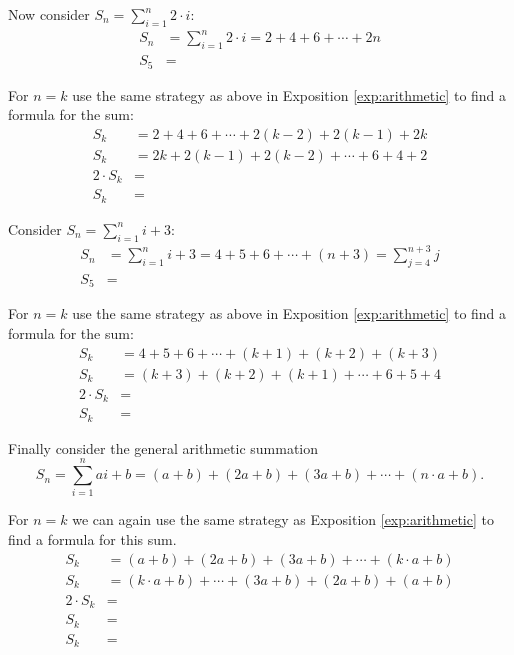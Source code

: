 \begin{practiceprob} Now consider \(S_n=\sum_{i=1}^n 2\cdot i\):
    \begin{align*}
        S_n&=\sum_{i=1}^n 2\cdot i=2+4+6+\cdots+2n\\[20pt]
        S_5&=
    \end{align*}
    
    For \(n=k\) use the same strategy as above in Exposition \ref{exp:arithmetic} to find a formula for the sum:
    \begin{align*}
        S_{k}&=2+4+6+\cdots+2(k-2)+2(k-1)+2k\\
        S_{k}&=2k+2(k-1)+2(k-2)+\cdots+6+4+2\\[20pt]
        2\cdot S_{k}&=\\[20pt]
        S_{k}&=
    \end{align*}
\end{practiceprob}

\begin{practiceprob} Consider \(S_n=\sum_{i=1}^n i+3\):
    \begin{align*}
        S_n&=\sum_{i=1}^n i+3 = 4+5+6+\cdots+(n+3)=\sum_{j=4}^{n+3} j\\[20pt]
        S_5&=
    \end{align*}

For \(n=k\) use the same strategy as above in Exposition \ref{exp:arithmetic} to find a formula for the sum:
    \begin{align*}
        S_{k}&=4+5+6+\cdots+(k+1)+(k+2)+(k+3)\\
        S_{k}&=(k+3)+(k+2)+(k+1)+\cdots+6+5+4\\[20pt]
        2\cdot S_{k}&=\\[20pt]
        S_{k}&=
    \end{align*}
\end{practiceprob}

\clearpage

\begin{exposition}\label{exp:gen_arith} Finally consider the general arithmetic summation \[S_n=\sum_{i=1}^n ai+b=(a+b)+(2a+b)+(3a+b)+\cdots+(n\cdot a+b).\]

For \(n=k\) we can again use the same strategy as Exposition \ref{exp:arithmetic} to find a formula for this sum.
    \begin{align*}
        S_{k}&=(a+b)+(2a+b)+(3a+b)+\cdots+(k\cdot a+b)\\
        S_{k}&=(k\cdot a+b)+\cdots+(3a+b)+(2a+b)+(a+b)\\[30pt]
        2\cdot S_{k}&= \\[30pt]
        S_{k}&=\\[30pt]
        S_{k}&=
    \end{align*}
    \vspace{\baselineskip}
\end{exposition}

